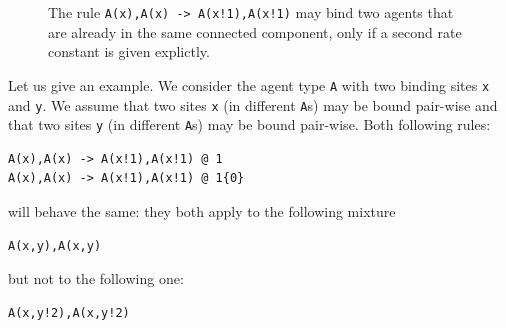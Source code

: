 \documentclass[11pt]{book}
\begin{document}
\begin{figure}[t]
  \hfill\begin{minipage}{0.4\linewidth}
\end{minipage}\hfill\begin{minipage}{0.4\linewidth}
\end{minipage}\hfill\mbox{}
\caption{The rule \texttt{A(x),A(x) -> A(x!1),A(x!1)} may bind two agents that are already in the same connected component, only if a second rate constant is given explictly.}
\end{figure}
  Let us give an example. We consider the agent type \texttt{A} with two binding sites \texttt{x} and \texttt{y}. We assume that two sites \texttt{x} (in different \texttt{A}s) may be bound pair-wise and that two sites \texttt{y} (in different \texttt{A}s) may be bound pair-wise. Both following rules:
\begin{lstlisting}[language=kappa]
A(x),A(x) -> A(x!1),A(x!1) @ 1
A(x),A(x) -> A(x!1),A(x!1) @ 1{0}
\end{lstlisting}
  will behave the same: they both apply to the following mixture
\begin{lstlisting}[language=kappa]
A(x,y),A(x,y)
\end{lstlisting}
  but not to the following one:
\begin{lstlisting}[language=kappa]
A(x,y!2),A(x,y!2)
\end{lstlisting}
\end{document}

